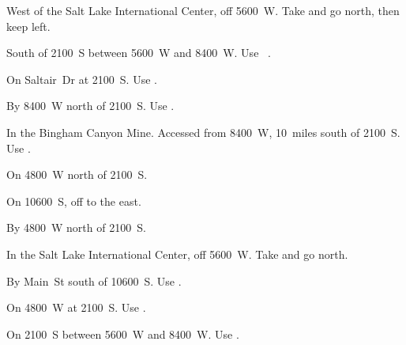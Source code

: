 
\begin{LocationList}

West of the Salt Lake International Center, off 5600~W.
Take   and go north, then keep left.

South of  2100~S between  5600~W and 8400~W.
Use~ .

On  Saltair~Dr at  2100~S.
Use  .

By 8400~W north of  2100~S.
Use  .

In the Bingham Canyon Mine.
Accessed from 8400~W, 10~miles south of  2100~S.
Use  .

\Location{\GarageHQ \Garage}
On 4800~W north of  2100~S.

On 10600~S, off   to the east.

\Location{\RecruitmentAgency \Recruitment}
By 4800~W north of  2100~S.

In the Salt Lake International Center, off 5600~W.
Take   and go north.

By Main~St south of  10600~S.
Use  .

\Location{\TruckStop \Gas \Rest \Weigh}
On 4800~W at  2100~S.
Use  .

On  2100~S between  5600~W and 8400~W.
Use  .

\end{LocationList}
